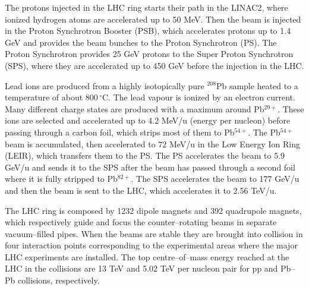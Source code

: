 The protons injected in the LHC ring starts their path in the LINAC2, where ionized hydrogen
atoms are accelerated up to 50 MeV. Then the beam is injected in the Proton Synchrotron Booster 
(PSB), which accelerates protons up to 1.4 GeV and provides the beam bunches to the Proton 
Synchrotron (PS). The Proton Synchrotron provides 25 GeV protons to the Super Proton Synchrotron
(SPS), where they are accelerated up to 450 GeV before the injection in the LHC.

Lead ions are produced from a highly isotopically pure $^{208}$Pb sample heated to a temperature
of about $800\,^{\circ}\mathrm{C}$.
The lead vapour is ionized by an electron current. Many different charge states are produced
with a maximum around Pb$^{29+}$.
These ions are selected and accelerated up to 4.2 MeV/u (energy per nucleon) before passing through
a carbon foil, which strips most of them to Pb$^{54+}$. The Pb$^{54+}$ beam is accumulated, then
accelerated to 72 MeV/u in the Low Energy Ion Ring (LEIR), which transfers them to the PS.
The PS accelerates the beam to 5.9 GeV/u and sends it to the SPS after the beam has passed through a second foil where it is fully stripped to Pb$^{82+}$. 
The SPS accelerates the beam to 177 GeV/u and then the beam is sent to the LHC, which accelerates it to 2.56 TeV/u.

The LHC ring is composed by 1232 dipole magnets and 392 quadrupole magnets, which respectively 
guide and focus the counter–rotating beams in separate vacuum–filled pipes.
When the beams are stable they are brought into collision in four interaction points corresponding
to the experimental areas where the major LHC experiments are installed.
The top centre–of–mass energy reached at the LHC in the collisions are 13 TeV and 5.02 TeV per 
nucleon pair for pp and Pb--Pb collisions, respectively.


